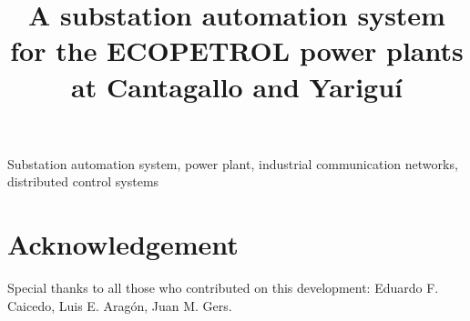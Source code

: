 \documentclass[10pt,conference,compsocconf]{IEEEtran}
\newcommand{\ecopetrol}{\textsf{ECOPETROL}\xspace}
\begin{document}
\title{A substation automation system for the \ecopetrol power plants at Cantagallo and Yariguí}


\maketitle



\begin{IEEEkeywords}
Substation automation system, power plant, industrial communication networks, distributed control systems
\end{IEEEkeywords}

\IEEEpeerreviewmaketitle







\section*{Acknowledgement} Special thanks to all those who contributed on this development: Eduardo F. Caicedo, Luis E. Aragón, Juan M. Gers.



\end{document}
